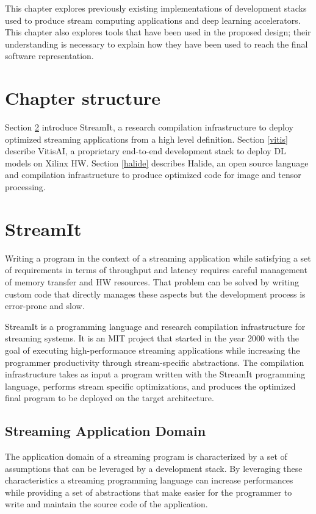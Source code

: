 \documentclass[../main.tex]{subfiles}
\begin{document}
This chapter explores previously existing implementations of development stacks used to produce stream computing applications and deep learning accelerators. 
This chapter also explores tools that have been used in the proposed design; their understanding is necessary to explain how they have been used to reach the final software representation.

\newpage
\section{Chapter structure}
Section \ref{streamit} introduce StreamIt, a research compilation infrastructure to deploy optimized streaming applications from a high level definition.
Section \ref{vitis} describe VitisAI, a proprietary end-to-end development stack to deploy DL models on Xilinx HW.
Section \ref{halide} describes Halide, an open source language and compilation infrastructure to produce optimized code for image and tensor processing.


\section{StreamIt}
\label{streamit}

Writing a program in the context of a streaming application while satisfying a set of requirements in terms of throughput and latency requires careful management of memory transfer and HW resources. That problem can be solved by writing custom code that directly manages these aspects but the development process is error-prone and slow.

StreamIt is a programming language and research compilation infrastructure for streaming systems. It is an MIT project that started in the year 2000 with the goal of executing high-performance streaming applications while increasing the programmer productivity through stream-specific abstractions. The compilation infrastructure takes as input a program written with the StreamIt programming language, performs stream specific optimizations, and produces the optimized final program to be deployed on the target architecture.

\newpage

\subsection{Streaming Application Domain}
The application domain of a streaming program is characterized by a set of assumptions \cite{streamit1} that can be leveraged by a development stack. By leveraging these characteristics a streaming programming language can increase performances while providing a set of abstractions that make easier for the programmer to write and maintain the source code of the application.
\end{document}
